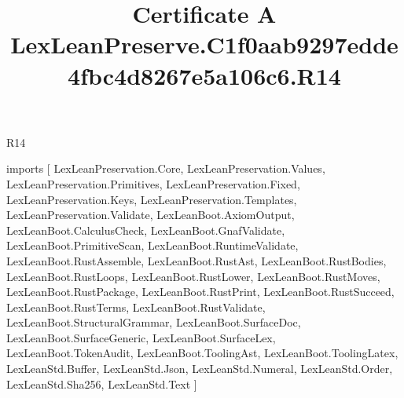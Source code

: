\begin{lexlean}{R14}
\title{Certificate A LexLeanPreserve.C1f0aab9297edde4fbc4d8267e5a106c6.R14}
\begin{coremodule}
imports [
  LexLeanPreservation.Core,
  LexLeanPreservation.Values,
  LexLeanPreservation.Primitives,
  LexLeanPreservation.Fixed,
  LexLeanPreservation.Keys,
  LexLeanPreservation.Templates,
  LexLeanPreservation.Validate,
  LexLeanBoot.AxiomOutput,
  LexLeanBoot.CalculusCheck,
  LexLeanBoot.GnafValidate,
  LexLeanBoot.PrimitiveScan,
  LexLeanBoot.RuntimeValidate,
  LexLeanBoot.RustAssemble,
  LexLeanBoot.RustAst,
  LexLeanBoot.RustBodies,
  LexLeanBoot.RustLoops,
  LexLeanBoot.RustLower,
  LexLeanBoot.RustMoves,
  LexLeanBoot.RustPackage,
  LexLeanBoot.RustPrint,
  LexLeanBoot.RustSucceed,
  LexLeanBoot.RustTerms,
  LexLeanBoot.RustValidate,
  LexLeanBoot.StructuralGrammar,
  LexLeanBoot.SurfaceDoc,
  LexLeanBoot.SurfaceGeneric,
  LexLeanBoot.SurfaceLex,
  LexLeanBoot.TokenAudit,
  LexLeanBoot.ToolingAst,
  LexLeanBoot.ToolingLatex,
  LexLeanStd.Buffer,
  LexLeanStd.Json,
  LexLeanStd.Numeral,
  LexLeanStd.Order,
  LexLeanStd.Sha256,
  LexLeanStd.Text
]


\end{coremodule}
\end{lexlean}
